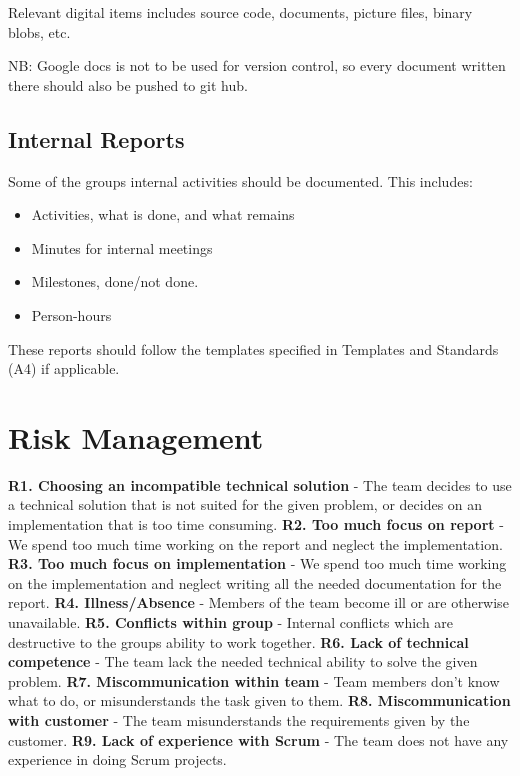 Relevant digital items includes source code, documents, picture files, binary blobs, etc.

NB: Google docs is not to be used for version control, so every document written there should also be pushed to git hub.

\subsection{Internal Reports}
Some of the groups internal activities should be documented. This includes:
\begin{itemize}
	\item Activities, what is done, and what remains
	\item Minutes for internal meetings
	\item Milestones, done/not done.
	\item Person-hours
\end{itemize}
These reports should follow the templates specified in Templates and Standards (A4) if applicable.

\section{Risk Management}

\textbf{R1. Choosing an incompatible technical solution} - The team decides to use a technical solution that is not suited for the given problem, or decides on an implementation that is too time consuming. \newline
\textbf{R2. Too much focus on report} -  We spend too much time working on the report and neglect the implementation. \newline
\textbf{R3. Too much focus on implementation} - We spend too much time working on the implementation and neglect writing all the needed documentation for the report. \newline
\textbf{R4. Illness/Absence} - Members of the team become ill or are otherwise unavailable. \newline
\textbf{R5. Conflicts within group} - Internal conflicts which are destructive to the groups ability to work together. \newline
\textbf{R6. Lack of technical competence} - The team lack the needed technical ability to solve the given problem. \newline
\textbf{R7. Miscommunication within team} - Team members don’t know what to do, or misunderstands the task given to them. \newline
\textbf{R8. Miscommunication with customer} - The team misunderstands the requirements given by the customer. \newline
\textbf{R9. Lack of experience with Scrum} - The team does not have any experience in doing Scrum projects. \newline


